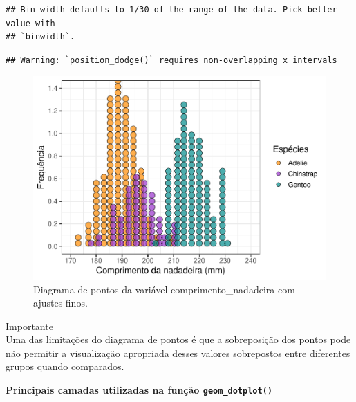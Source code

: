 \documentclass[
]{article}
\begin{document}
\begin{verbatim}
## Bin width defaults to 1/30 of the range of the data. Pick better value with
## `binwidth`.
\end{verbatim}

\begin{verbatim}
## Warning: `position_dodge()` requires non-overlapping x intervals
\end{verbatim}

\begin{figure}
\includegraphics[width=0.75\linewidth,height=0.75\textheight]{epr_files/figure-latex/fig-dot-flipper-fino-1} \caption{Diagrama de pontos da variável comprimento_nadadeira com ajustes finos.}\label{fig:fig-dot-flipper-fino}
\end{figure}

Importante \\
Uma das limitações do diagrama de pontos é que a sobreposição dos pontos pode não permitir a visualização apropriada desses valores sobrepostos entre diferentes grupos quando comparados.

\textbf{Principais camadas utilizadas na função \texttt{geom\_dotplot()}}
\end{document}

